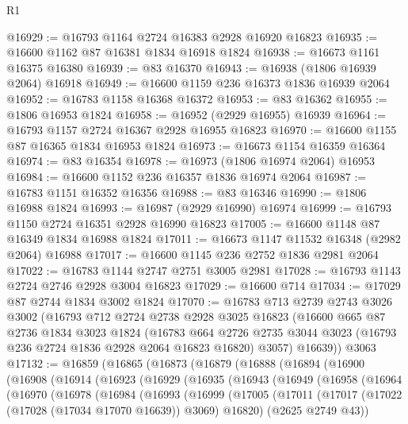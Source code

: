 \begin{lexlean}{R1}
\begin{coremodule}
@16929 := @16793 @1164 @2724 @16383 @2928 @16920 @16823
@16935 := @16600 @1162 @87 @16381 @1834 @16918 @1824
@16938 := @16673 @1161 @16375 @16380
@16939 := @83 @16370
@16943 := @16938 (@1806 @16939 @2064) @16918
@16949 := @16600 @1159 @236 @16373 @1836 @16939 @2064
@16952 := @16783 @1158 @16368 @16372
@16953 := @83 @16362
@16955 := @1806 @16953 @1824
@16958 := @16952 (@2929 @16955) @16939
@16964 := @16793 @1157 @2724 @16367 @2928 @16955 @16823
@16970 := @16600 @1155 @87 @16365 @1834 @16953 @1824
@16973 := @16673 @1154 @16359 @16364
@16974 := @83 @16354
@16978 := @16973 (@1806 @16974 @2064) @16953
@16984 := @16600 @1152 @236 @16357 @1836 @16974 @2064
@16987 := @16783 @1151 @16352 @16356
@16988 := @83 @16346
@16990 := @1806 @16988 @1824
@16993 := @16987 (@2929 @16990) @16974
@16999 := @16793 @1150 @2724 @16351 @2928 @16990 @16823
@17005 := @16600 @1148 @87 @16349 @1834 @16988 @1824
@17011 := @16673 @1147 @11532 @16348 (@2982 @2064) @16988
@17017 := @16600 @1145 @236 @2752 @1836 @2981 @2064
@17022 := @16783 @1144 @2747 @2751 @3005 @2981
@17028 := @16793 @1143 @2724 @2746 @2928 @3004 @16823
@17029 := @16600 @714
@17034 := @17029 @87 @2744 @1834 @3002 @1824
@17070 := @16783
    @713
    @2739
    @2743
    @3026
    @3002
    (@16793
      @712
      @2724
      @2738
      @2928
      @3025
      @16823
      (@16600
        @665
        @87
        @2736
        @1834
        @3023
        @1824
        (@16783
          @664
          @2726
          @2735
          @3044
          @3023
          (@16793 @236 @2724 @1836 @2928 @2064 @16823 @16820)
          @3057)
        @16639))
    @3063
@17132 := @16859
    (@16865
      (@16873
        (@16879
          (@16888
            (@16894
              (@16900
                (@16908
                  (@16914
                    (@16923
                      (@16929
                        (@16935
                          (@16943
                            (@16949
                              (@16958
                                (@16964
                                  (@16970
                                    (@16978
                                      (@16984
                                        (@16993
                                          (@16999
                                            (@17005
                                              (@17011
                                                (@17017
                                                  (@17022 (@17028 (@17034 @17070 @16639)) @3069)
                                                  @16820)
                                                (@2625 @2749 @43))

\end{coremodule}
\end{lexlean}
